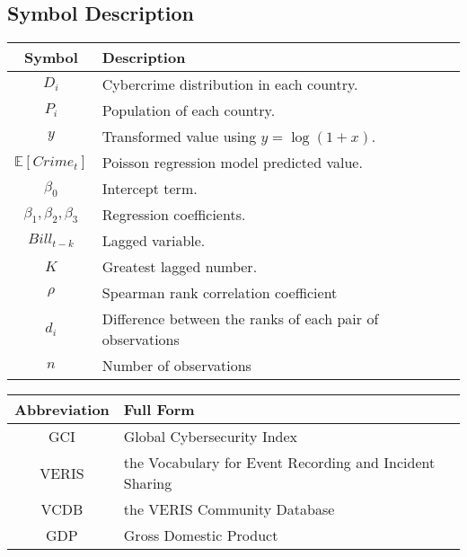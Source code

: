 
\subsection{Symbol Description}\label{subsec:symbol-description} %
\begin{tabular}{cl}
    \hline
    \textbf{Symbol} & \textbf{Description} \\
    \hline
    $D_i$                     & Cybercrime distribution in each country. \\
    $P_i$                     & Population of each country. \\
    $y$                       & Transformed value using \( y = \log(1 + x) \). \\
    $\mathbb{E}[Crime_t]$     & Poisson regression model predicted value. \\
    $\beta_0$                 & Intercept term. \\
    $\beta_1,\beta_2,\beta_3$ & Regression coefficients. \\
    $Bill_{t-k}$              & Lagged variable. \\
    $K$                       & Greatest lagged number. \\
    $\rho$                    & Spearman rank correlation coefficient \\
    $d_i$                     & Difference between the ranks of each pair of observations \\
    $n$                       & Number of observations \\
    \hline
\end{tabular}

\bigskip

\noindent
\begin{tabular}{cl}
    \hline
    \textbf{Abbreviation} & \textbf{Full Form} \\
    \hline
    GCI   & Global Cybersecurity Index\cite{gci-2024} \\
    VERIS & the Vocabulary for Event Recording and Incident Sharing\cite{veris} \\
    VCDB  & the VERIS Community Database\cite{vcdb} \\
    GDP   & Gross Domestic Product \\
    \hline
\end{tabular}
